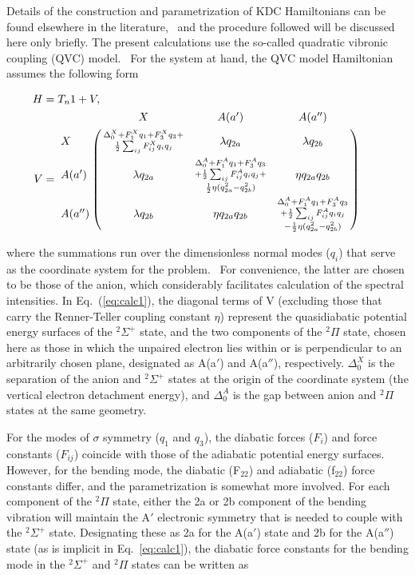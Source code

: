 \documentclass[journal=jpcafh,manuscript=article,layout=onecolumn, 12pt]{achemso}
\begin{document}
Details of the construction and parametrization of KDC Hamiltonians can be found elsewhere in the literature,~\cite{sta21,ich06,ich08,ich09,wei17} and the procedure followed will be discussed here only briefly. The present calculations use the so-called quadratic vibronic coupling (QVC) model.~\cite{ich06} For the system at hand, the QVC model Hamiltonian  assumes the following form

\begin{align}
H &= T_n1+V,\\
V &= \bordermatrix{ & X & A(a') & A(a'') \cr
	X &\substack{\Delta_0^X+F_1^Xq_1+F_3^Xq_3+\\ 
		\frac{1}{2} \sum_{ij}F^X_{ij}q_iq_j}& \lambda q_{2a} & \lambda q_{2b} \cr
	A(a') & \lambda q_{2a} & \substack{\Delta^A_0+F^A_1q_1+F^A_3q_3\\+\frac{1}{2}\sum_{ij}F^A_{ij}q_iq_j+\\\frac{1}{2}\eta(q_{2a}^2-q_{2b}^2)} & \eta q_{2a}q_{2b} \cr
	A(a'') & \lambda q_{2b} & \eta q_{2a}q_{2b} & \substack{\Delta_0^A+F_1^Aq_1+F_3^Aq_3\\+\frac{1}{2}\sum_{ij}F_{ij}^Aq_iq_j\\-\frac{1}{2}\eta(q_{2a}^2-q_{2b}^2) } } \qquad
\label{eq:calc1}
\end{align}

where the summations run over the dimensionless normal modes ($q_i$) that serve as the coordinate system for the problem.~\cite{sta21,car00} For convenience, the latter are chosen to be those of the anion, which considerably facilitates calculation of the spectral intensities.  In Eq.~(\ref{eq:calc1}), the diagonal terms of V (excluding those that carry the Renner-Teller coupling constant $\eta$) represent the quasidiabatic potential energy surfaces of the $^2\Sigma^+$ state, and the two components of the $^2\Pi$ state, chosen here as those in which the unpaired electron lies within or is perpendicular to an arbitrarily chosen plane, designated as A(a$'$) and A(a$''$), respectively. $\Delta_0^X$ is the separation of the anion and $^2\Sigma^+$ states at the origin of the coordinate system (the vertical electron detachment energy), and $\Delta_0^{A}$ is the gap between anion and $^2\Pi$ states at the same geometry.   

For the modes of $\sigma$ symmetry ($q_1$ and $q_3$), the diabatic forces ($F_i$) and force constants ($F_{ij}$) coincide with those of the adiabatic potential energy surfaces.   However, for the bending mode, the diabatic (F$_{22}$) and adiabatic (f$_{22}$) force constants differ, and the parametrization is somewhat more involved.   For each component of the $^2\Pi$ state, either the 2a or 2b component of the bending vibration will maintain the A$'$ electronic symmetry that is needed to couple with the $^2\Sigma^+$ state.  Designating these as 2a for the A(a$'$) state and 2b for the A(a$''$) state (as is implicit in Eq.~\ref{eq:calc1}), the diabatic force constants for the bending mode in the $^2\Sigma^+$ and $^2\Pi$ states can be written as 
\end{document}
